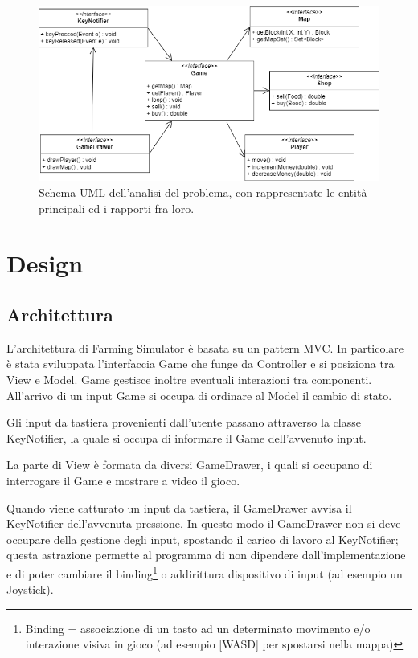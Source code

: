 \documentclass[a4paper,12pt]{report}
\begin{document}
\begin{figure}[!htb]
\centerline{\includegraphics[scale=0.7]{img/UML_1-1.png}}
\caption{Schema UML dell'analisi del problema, con rappresentate le entità principali ed i rapporti fra loro.}
\label{img:analysis}
\end{figure}

\chapter{Design}

\section{Architettura}

L’architettura di Farming Simulator è basata su un pattern MVC. In particolare è stata sviluppata l’interfaccia Game che funge da Controller e si posiziona tra View e Model. Game gestisce inoltre eventuali interazioni tra componenti. All’arrivo di un input Game si occupa di ordinare al Model il cambio di stato.


Gli input da tastiera provenienti dall’utente passano attraverso la classe KeyNotifier, la quale si occupa di informare il Game dell’avvenuto input. 


La parte di View è formata da diversi GameDrawer, i quali si occupano di interrogare il Game e mostrare a video il gioco.

Quando viene catturato un input da tastiera, il GameDrawer avvisa il KeyNotifier dell’avvenuta pressione. In questo modo il GameDrawer non si deve occupare della gestione degli input, spostando il carico di lavoro al KeyNotifier; questa astrazione permette al programma di non dipendere dall'implementazione e di poter cambiare il binding\footnote[1]{Binding = associazione di un tasto ad un determinato movimento e/o interazione visiva in gioco (ad esempio [WASD] per spostarsi nella mappa)} o addirittura dispositivo di input (ad esempio un Joystick). 
\end{document}
